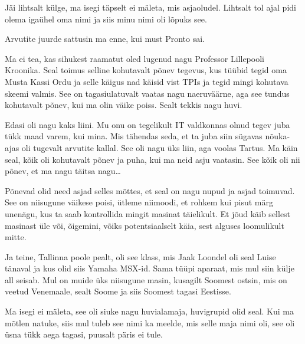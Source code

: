                  

Jäi lihtsalt külge, ma isegi täpselt ei mäleta, mis asjaoludel. Lihtsalt tol ajal pidi olema igaühel oma nimi ja siis minu nimi oli lõpuks see.


Arvutite juurde sattusin ma enne, kui must Pronto sai.

Ma ei tea, kas sihukest raamatut oled lugenud nagu Professor Lillepooli Kroonika. Seal toimus selline kohutavalt põnev tegevus, kus tüübid tegid oma Musta Kassi Ordu ja selle käigus nad käisid vist TPIs ja tegid mingi kohutava skeemi valmis. See on  tagasiulatuvalt vaatas nagu naeruväärne, aga see tundus kohutavalt  põnev, kui ma  olin väike poiss. Sealt tekkis nagu huvi. 

Edasi oli nagu kaks liini. Mu onu on tegelikult IT valdkonnas olnud tegev juba tükk maad varem, kui mina. Mis tähendas seda, et ta juba siin sügavas nõuka-ajas oli tugevalt arvutite kallal. See oli nagu üks liin, aga voolas Tartus. Ma käin seal, kõik oli kohutavalt põnev ja puha, kui ma neid asju vaatasin. See kõik oli nii põnev, et ma nagu täitsa nagu\ldots


Põnevad olid need asjad selles mõttes, et seal on nagu nupud ja asjad toimuvad. See on niisugune väikese poisi, ütleme niimoodi, et rohkem kui pisut märg unenägu, kus ta saab kontrollida mingit masinat täielikult. Et jõud käib sellest masinast üle või, õigemini, võiks potentsiaalselt käia, sest alguses loomulikult mitte. 

Ja teine, Tallinna poole pealt, oli see klass, mis Jaak Loondel oli seal Luise tänaval ja kus olid siis Yamaha MSX-id. Sama tüüpi aparaat, mis mul siin külje all seisab. Mul on muide üks niisugune masin, kusagilt Soomest ostsin, mis on veetud Venemaale, sealt Soome ja siis Soomest tagasi Eestisse.


Ma isegi ei mäleta, see oli siuke  nagu huvialamaja, huvigrupid olid seal. Kui ma mõtlen natuke, siis mul tuleb see nimi ka meelde, mis selle maja nimi oli, see oli üsna tükk aega tagasi, puusalt päris ei tule.
                 
